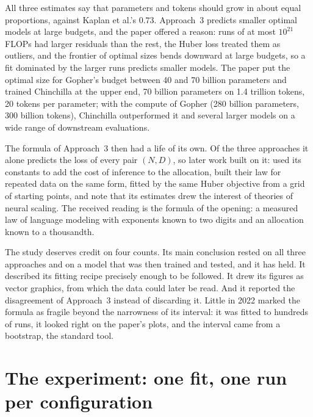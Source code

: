 \begin{refsection}
All three estimates say that parameters and tokens should grow in about equal proportions, against Kaplan et al.'s $0.73$. Approach~3 predicts smaller optimal models at large budgets, and the paper offered a reason: runs of at most $10^{21}$ FLOPs had larger residuals than the rest, the Huber loss treated them as outliers, and the frontier of optimal sizes bends downward at large budgets, so a fit dominated by the larger runs predicts smaller models. The paper put the optimal size for Gopher's budget between 40 and 70 billion parameters and trained Chinchilla at the upper end, 70 billion parameters on 1.4 trillion tokens, 20 tokens per parameter; with the compute of Gopher (280 billion parameters, 300 billion tokens), Chinchilla outperformed it and several larger models on a wide range of downstream evaluations.

The formula of Approach~3 then had a life of its own. Of the three approaches it alone predicts the loss of every pair $(N,D)$, so later work built on it: \textcite{SardanaEtAl2024} used its constants to add the cost of inference to the allocation, \textcite{MuennighoffEtAl2023} built their law for repeated data on the same form, fitted by the same Huber objective from a grid of starting points, and \textcite{BesirogluEtAl2024} note that its estimates drew the interest of theories of neural scaling. The received reading is the formula of the opening: a measured law of language modeling with exponents known to two digits and an allocation known to a thousandth.

The study deserves credit on four counts. Its main conclusion rested on all three approaches and on a model that was then trained and tested, and it has held. It described its fitting recipe precisely enough to be followed. It drew its figures as vector graphics, from which the data could later be read. And it reported the disagreement of Approach~3 instead of discarding it. Little in 2022 marked the formula as fragile beyond the narrowness of its interval: it was fitted to hundreds of runs, it looked right on the paper's plots, and the interval came from a bootstrap, the standard tool.

\section{The experiment: one fit, one run per configuration}\label{sec:fitting:experiment}


\end{refsection}
